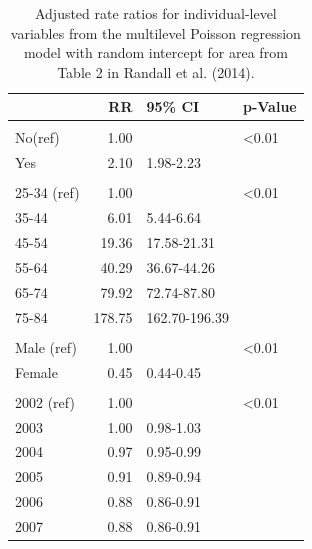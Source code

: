 \documentclass[
]{krantz}
\begin{document}
\begin{table}
\centering
\caption{\label{tab:table4chp11}Adjusted rate ratios for individual-level variables from the multilevel Poisson regression model with random intercept for area from Table 2 in Randall et al. (2014).}
\centering
\begin{tabular}[t]{lrll}
\toprule
  & RR & 95\% CI & p-Value\\
\midrule
\addlinespace[0.3em]
\multicolumn{4}{l}{\textbf{Aboriginal}}\\
\hspace{1em}No(ref) & 1.00 &  & <0.01\\
\hspace{1em}Yes & 2.10 & 1.98-2.23 & \\
\addlinespace[0.3em]
\multicolumn{4}{l}{\textbf{Age Group}}\\
\hspace{1em}25-34 (ref) & 1.00 &  & <0.01\\
\hspace{1em}35-44 & 6.01 & 5.44-6.64 & \\
\hspace{1em}45-54 & 19.36 & 17.58-21.31 & \\
\hspace{1em}55-64 & 40.29 & 36.67-44.26 & \\
\hspace{1em}65-74 & 79.92 & 72.74-87.80 & \\
\hspace{1em}75-84 & 178.75 & 162.70-196.39 & \\
\addlinespace[0.3em]
\multicolumn{4}{l}{\textbf{Sex}}\\
\hspace{1em}Male (ref) & 1.00 &  & <0.01\\
\hspace{1em}Female & 0.45 & 0.44-0.45 & \\
\addlinespace[0.3em]
\multicolumn{4}{l}{\textbf{Year}}\\
\hspace{1em}2002 (ref) & 1.00 &  & <0.01\\
\hspace{1em}2003 & 1.00 & 0.98-1.03 & \\
\hspace{1em}2004 & 0.97 & 0.95-0.99 & \\
\hspace{1em}2005 & 0.91 & 0.89-0.94 & \\
\hspace{1em}2006 & 0.88 & 0.86-0.91 & \\
\hspace{1em}2007 & 0.88 & 0.86-0.91 & \\
\bottomrule
\end{tabular}
\end{table}
\end{document}
